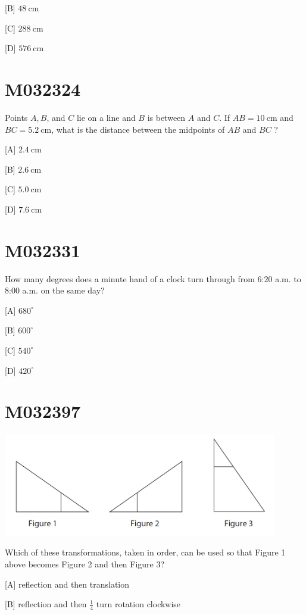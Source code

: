 \documentclass[12pt]{article}
\begin{document}
[B] $48 \mathrm{~cm}$

[C] $288 \mathrm{~cm}$

[D] $576 \mathrm{~cm}$

\newpage
\section*{M032324}

Points $A, B$, and $C$ lie on a line and $B$ is between $A$ and $C$. If $A B=10 \mathrm{~cm}$ and $B C=5.2 \mathrm{~cm}$, what is the distance between the midpoints of $A B$ and $B C$ ?

[A] $2.4 \mathrm{~cm}$

[B] $2.6 \mathrm{~cm}$

[C] $5.0 \mathrm{~cm}$

[D] $7.6 \mathrm{~cm}$

\newpage
\section*{M032331}

How many degrees does a minute hand of a clock turn through from 6:20 a.m. to 8:00 a.m. on the same day?

[A] $680^{\circ}$

[B] $600^{\circ}$

[C] $540^{\circ}$

[D] $420^{\circ}$

\newpage
\section*{M032397}


\includegraphics[max width=0.9\textwidth]{2024_02_20_828ebc9d68bcc1fbb223g-55}

Which of these transformations, taken in order, can be used so that Figure 1 above becomes Figure 2 and then Figure 3?

[A] reflection and then translation

[B] reflection and then $\frac{1}{4}$ turn rotation clockwise
\end{document}
